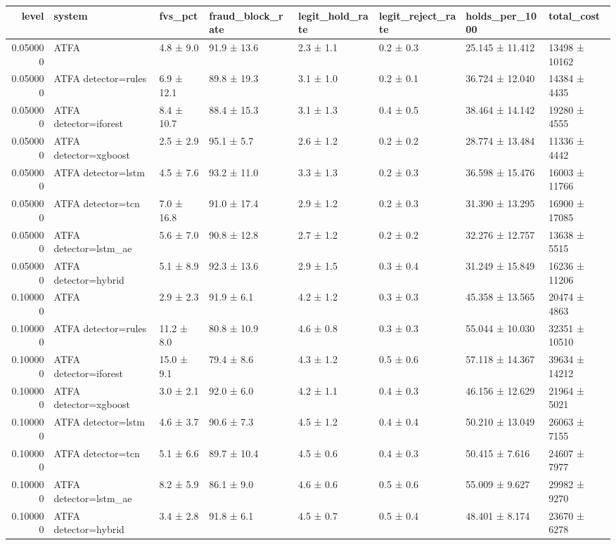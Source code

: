 \begin{tabular}{rlllllll}
\toprule
level & system & fvs\_pct & fraud\_block\_rate & legit\_hold\_rate & legit\_reject\_rate & holds\_per\_1000 & total\_cost \\
\midrule
0.050000 & ATFA & 4.8 ± 9.0 & 91.9 ± 13.6 & 2.3 ± 1.1 & 0.2 ± 0.3 & 25.145 ± 11.412 & 13498 ± 10162 \\
0.050000 & ATFA detector=rules & 6.9 ± 12.1 & 89.8 ± 19.3 & 3.1 ± 1.0 & 0.2 ± 0.1 & 36.724 ± 12.040 & 14384 ± 4435 \\
0.050000 & ATFA detector=iforest & 8.4 ± 10.7 & 88.4 ± 15.3 & 3.1 ± 1.3 & 0.4 ± 0.5 & 38.464 ± 14.142 & 19280 ± 4555 \\
0.050000 & ATFA detector=xgboost & 2.5 ± 2.9 & 95.1 ± 5.7 & 2.6 ± 1.2 & 0.2 ± 0.2 & 28.774 ± 13.484 & 11336 ± 4442 \\
0.050000 & ATFA detector=lstm & 4.5 ± 7.6 & 93.2 ± 11.0 & 3.3 ± 1.3 & 0.2 ± 0.3 & 36.598 ± 15.476 & 16003 ± 11766 \\
0.050000 & ATFA detector=tcn & 7.0 ± 16.8 & 91.0 ± 17.4 & 2.9 ± 1.2 & 0.2 ± 0.3 & 31.390 ± 13.295 & 16900 ± 17085 \\
0.050000 & ATFA detector=lstm\_ae & 5.6 ± 7.0 & 90.8 ± 12.8 & 2.7 ± 1.2 & 0.2 ± 0.2 & 32.276 ± 12.757 & 13638 ± 5515 \\
0.050000 & ATFA detector=hybrid & 5.1 ± 8.9 & 92.3 ± 13.6 & 2.9 ± 1.5 & 0.3 ± 0.4 & 31.249 ± 15.849 & 16236 ± 11206 \\
0.100000 & ATFA & 2.9 ± 2.3 & 91.9 ± 6.1 & 4.2 ± 1.2 & 0.3 ± 0.3 & 45.358 ± 13.565 & 20474 ± 4863 \\
0.100000 & ATFA detector=rules & 11.2 ± 8.0 & 80.8 ± 10.9 & 4.6 ± 0.8 & 0.3 ± 0.3 & 55.044 ± 10.030 & 32351 ± 10510 \\
0.100000 & ATFA detector=iforest & 15.0 ± 9.1 & 79.4 ± 8.6 & 4.3 ± 1.2 & 0.5 ± 0.6 & 57.118 ± 14.367 & 39634 ± 14212 \\
0.100000 & ATFA detector=xgboost & 3.0 ± 2.1 & 92.0 ± 6.0 & 4.2 ± 1.1 & 0.4 ± 0.3 & 46.156 ± 12.629 & 21964 ± 5021 \\
0.100000 & ATFA detector=lstm & 4.6 ± 3.7 & 90.6 ± 7.3 & 4.5 ± 1.2 & 0.4 ± 0.4 & 50.210 ± 13.049 & 26063 ± 7155 \\
0.100000 & ATFA detector=tcn & 5.1 ± 6.6 & 89.7 ± 10.4 & 4.5 ± 0.6 & 0.4 ± 0.3 & 50.415 ± 7.616 & 24607 ± 7977 \\
0.100000 & ATFA detector=lstm\_ae & 8.2 ± 5.9 & 86.1 ± 9.0 & 4.6 ± 0.6 & 0.5 ± 0.6 & 55.009 ± 9.627 & 29982 ± 9270 \\
0.100000 & ATFA detector=hybrid & 3.4 ± 2.8 & 91.8 ± 6.1 & 4.5 ± 0.7 & 0.5 ± 0.4 & 48.401 ± 8.174 & 23670 ± 6278 \\

\end{tabular}
